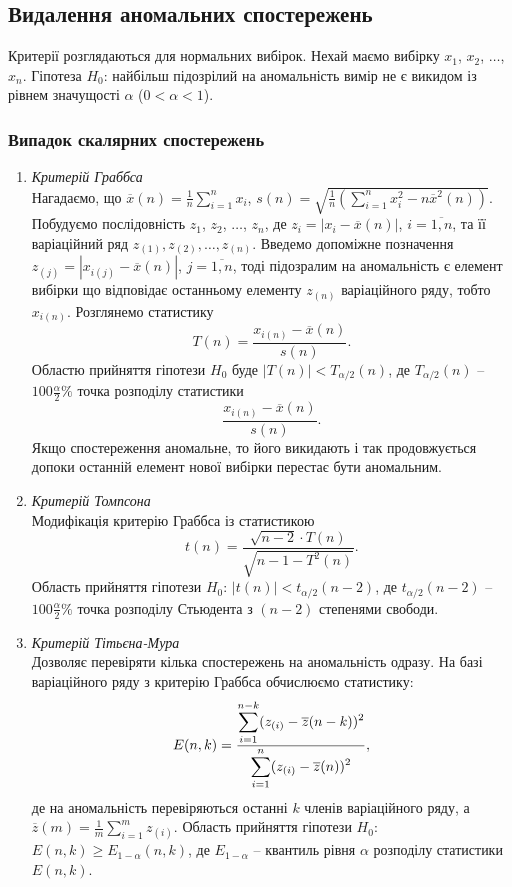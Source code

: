 \subsection{Видалення аномальних спостережень}
Критерії розглядаються для нормальних вибірок. Нехай маємо вибірку $x_1$, $x_2$, $\ldots$, $x_n$. Гіпотеза $H_0$: найбільш підозрілий на аномальність вимір не є викидом із рівнем значущості $\alpha$ ($0 < \alpha < 1$). 
\subsubsection{Випадок скалярних спостережень}
\begin{enumerate}
	\item \textit{Критерій Граббса} \\
 
	Нагадаємо, що $\overline{x}(n) = \frac{1}{n} \sum_{i = 1}^n x_i$, $s(n) = \sqrt{\frac{1}{n} \left( \sum_{i = 1}^n x_i^2 - n \overline{x}^2(n) \right)}$. Побудуємо послідовність $z_1$, $z_2$, $\ldots$, $z_n$, де $z_i = |x_i - \overline{x}(n)|$, $i = \overline{1, n}$, та її варіаційний ряд $z_{(1)}, z_{(2)}, \ldots, z_{(n)}$. Введемо допоміжне позначення $z_{(j)} = \left| x_{i(j)} - \overline{x}(n) \right|$, $j = \overline{1, n}$, тоді підозралим на аномальність є елемент вибірки що відповідає останньому елементу $z_{(n)}$ варіаційного ряду, тобто $x_{i(n)}$. Розглянемо статистику \[ T(n) = \dfrac{x_{i(n)} - \overline{x}(n)}{s(n)}. \] Областю прийняття гіпотези $H_0$ буде $|T(n)| < T_{\alpha/2}(n)$, де $T_{\alpha/2}(n)$ -- $100\frac{\alpha}{2}\%$ точка розподілу статистики \[\dfrac{x_{i(n)} - \overline{x}(n)}{s(n)}.\] Якщо спостереження аномальне, то його викидають і так продовжується допоки останній елемент нової вибірки перестає бути аномальним.
	\item \textit{Критерій Томпсона} \\

	Модифікація критерію Граббса із статистикою \[ t(n) = \dfrac{\sqrt{n - 2} \cdot T(n)}{\sqrt{n - 1 - T^2(n)}}. \] Область прийняття гіпотези $H_0$: $|t(n)| < t_{\alpha/2}(n - 2)$, де $t_{\alpha/2}(n - 2)$ -- $100\frac{\alpha}{2}\%$ точка розподілу Стьюдента з $(n - 2)$ степенями свободи.
	\item \textit{Критерій Тітьєна-Мура} \\

	Дозволяє перевіряти кілька спостережень на аномальність одразу. На базі варіаційного ряду з критерію Граббса обчислюємо статистику: \[ E(n, k) = \dfrac{\displaystyle\sum\limits_{i = 1}^{n - k} (z_{(i)} - \overline{z}(n - k))^2}{\displaystyle\sum\limits_{i = 1}^n (z_{(i)} - \overline{z}(n))^2}, \] де на аномальність перевіряються останні $k$ членів варіаційного ряду, а $\overline{z}(m) = \frac{1}{m} \sum_{i = 1}^{m} z_{(i)}$. Область прийняття гіпотези $H_0$: $E(n, k) \ge E_{1 - \alpha} (n, k)$, де $E_{1 - \alpha}$ -- квантиль рівня $\alpha$ розподілу статистики $E(n, k)$.
\end{enumerate}
